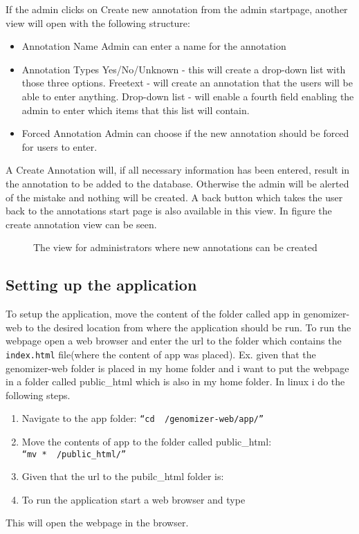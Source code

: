 If the admin clicks on Create new annotation from the admin startpage, another view will open with the following structure:
\begin{itemize}
 \item Annotation Name
 \subitem Admin can enter a name for the annotation
 
 \item Annotation Types
 \subitem Yes/No/Unknown - this will create a drop-down list with those three options.
 \subitem Freetext - will create an annotation that the users will be able to enter anything.
 \subitem Drop-down list - will enable a fourth field enabling the admin to enter which items that this list will contain.
 
 \item Forced Annotation
 \subitem Admin can choose if the new annotation should be forced for users to enter. 
\end{itemize}

A Create Annotation will, if all necessary information has been entered, result in the annotation to be added to the database. Otherwise the admin will be alerted of the mistake and nothing will be created.
\newpage
A back button which takes the user back to the annotations start page is also available in this view. In figure  the create annotation view can be seen.

\begin{figure}[t]
 \caption{The view for administrators where new annotations can be created}
 \label{adm_web_createView}
\end{figure}

\subsection{Setting up the application}
To setup the application, move the content of the folder called app in genomizer-web to the desired location from where the application should be run. To run the webpage open a web browser and enter the url to the folder which contains the \texttt{index.html} file(where the content of app was placed).
Ex. given that the genomizer-web folder is placed in my home folder and i want to put the webpage in a folder called public\_html which is also in my home folder. In linux i do the following steps.
\begin{enumerate}
	\item Navigate to the app folder: \texttt{“cd ~/genomizer-web/app/”}
	\item Move the contents of app to the folder called public\_html:\\ \texttt{“mv * ~/public\_html/”}
	\item Given that the url to the pubilc\_html folder is: \\ 
	\item To run the application start a web browser and type \\ 
\end{enumerate}
This will open the webpage in the browser.
